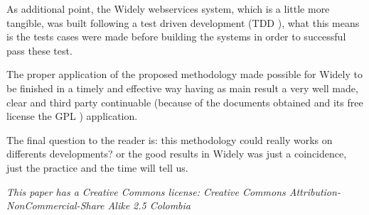 As additional point, the Widely webservices system, which is a little more tangible, was built following a test driven development (TDD \cite{tdd}), what this means is the tests cases were made before building the systems in order to successful pass these test. \newline

The proper application of the proposed methodology made possible for Widely to be finished in a timely and effective way having as main result a very well made, clear and third party continuable (because of the documents obtained and its free license the GPL \cite{gpl}) application.

The final question to the reader is: this methodology could really works on differents developments? or the good results in Widely was just a coincidence, just the practice and the time will tell us.\newline\newline



\textit{This paper has a Creative Commons license: Creative Commons  Attribution-NonCommercial-Share Alike 2.5 Colombia \cite{cc}}
